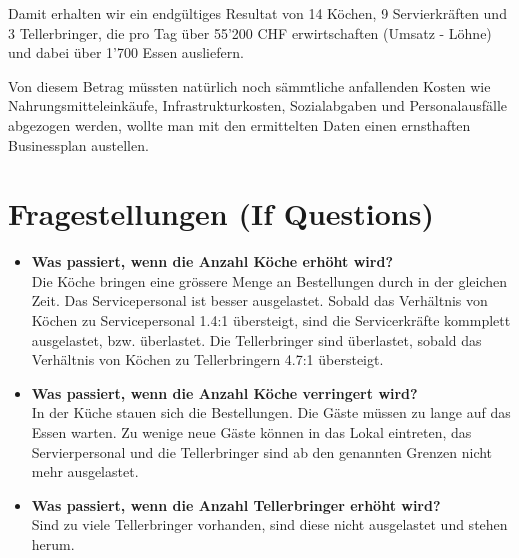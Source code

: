 \documentclass[ngerman,a4paper,12pt]{scrreprt}
\begin{document}
			Damit erhalten wir ein endgültiges Resultat von 14 Köchen, 9 Servierkräften und 3 Tellerbringer, die pro Tag über 55'200 CHF erwirtschaften (Umsatz - Löhne) und dabei über 1'700 Essen ausliefern. 
			
			Von diesem Betrag müssten natürlich noch sämmtliche anfallenden Kosten wie Nahrungsmitteleinkäufe, Infrastrukturkosten, Sozialabgaben und Personalausfälle abgezogen werden, wollte man mit den ermittelten Daten einen ernsthaften Businessplan austellen.

	\section{Fragestellungen (If Questions)}
		\begin{itemize}
			\item \textbf{Was passiert, wenn die Anzahl Köche erhöht wird?} \\
				Die Köche bringen eine grössere Menge an Bestellungen durch in der gleichen Zeit. Das Servicepersonal ist besser ausgelastet. Sobald das Verhältnis von Köchen zu Servicepersonal 1.4:1 übersteigt, sind die Servicerkräfte kommplett ausgelastet, bzw. überlastet. Die Tellerbringer sind überlastet, sobald das Verhältnis von Köchen zu Tellerbringern 4.7:1 übersteigt.
			\item \textbf{Was passiert, wenn die Anzahl Köche verringert wird?} \\
				In der Küche stauen sich die Bestellungen. Die Gäste müssen zu lange auf das Essen warten. Zu wenige neue Gäste können in das Lokal eintreten, das Servierpersonal und die Tellerbringer sind ab den genannten Grenzen nicht mehr ausgelastet.
			\item \textbf{Was passiert, wenn die Anzahl Tellerbringer erhöht wird?}\\
				Sind zu viele Tellerbringer vorhanden, sind diese nicht ausgelastet und stehen herum.
				

\end{itemize}
\end{document}
